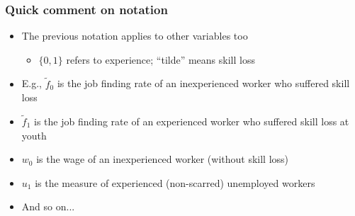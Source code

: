\documentclass[9pt,xcolor={svgnames}]{beamer}
\begin{document}
\begin{frame}
\begin{itemize}

\end{itemize}

\end{frame}



\begin{frame}

\frametitle{Quick comment on notation}

\begin{itemize}

\setlength\itemsep{1.8em}


\item The previous notation applies to other variables too  
\begin{itemize}
\smallskip
\item $\{0,1\}$ refers to experience; ``tilde'' means skill loss  
\end{itemize}

\item E.g., $\tilde{f}_0$ is the job finding rate of an inexperienced worker who suffered skill loss

\item $\tilde{f}_1$ is the job finding rate of an experienced worker who
suffered skill loss at youth

\item $w_0$ is the wage of an inexperienced worker (without skill loss)

\item $u_1$ is the measure of experienced (non-scarred) unemployed workers

\item And so on...



\end{itemize}


\end{frame}
\end{document}
